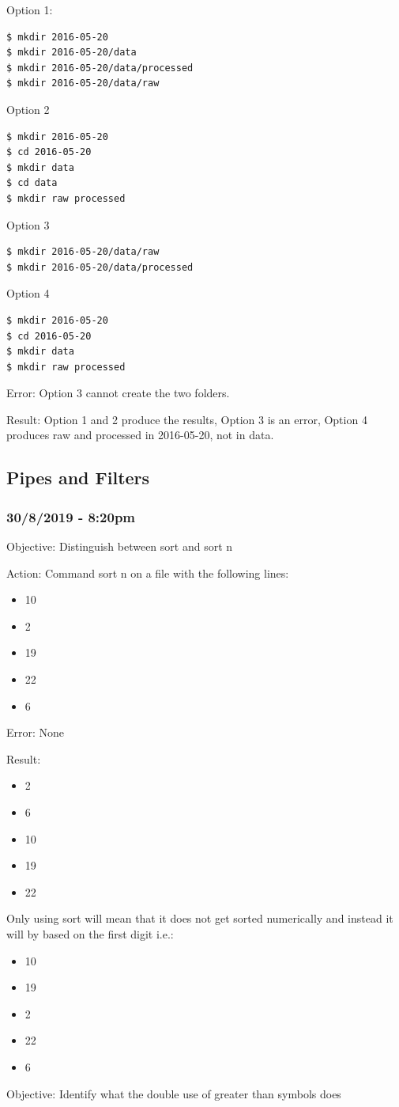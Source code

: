 \documentclass{article}
\begin{document}
Option 1:
\begin{verbatim}$ mkdir 2016-05-20
$ mkdir 2016-05-20/data
$ mkdir 2016-05-20/data/processed
$ mkdir 2016-05-20/data/raw\end{verbatim}

Option 2
\begin{verbatim}$ mkdir 2016-05-20
$ cd 2016-05-20
$ mkdir data
$ cd data
$ mkdir raw processed\end{verbatim}

Option 3
\begin{verbatim}$ mkdir 2016-05-20/data/raw
$ mkdir 2016-05-20/data/processed\end{verbatim}

Option 4
\begin{verbatim}$ mkdir 2016-05-20
$ cd 2016-05-20
$ mkdir data
$ mkdir raw processed\end{verbatim}

Error: Option 3 cannot create the two folders.\label{sec: ReproduceFolder}\par

Result: Option 1 and 2 produce the results, Option 3 is an error, Option 4 produces raw and processed in 2016-05-20, not in data.\par

\subsection{Pipes and Filters}
\subsubsection*{30/8/2019 - 8:20pm}

Objective: Distinguish between sort and sort n 

Action: Command sort n on a file with the following lines:
\begin{itemize}
\item 10 
\item 2
\item 19
\item 22
\item 6
\end{itemize}
Error: None

Result:\par
\begin{itemize}
\item 2
\item 6
\item 10
\item 19
\item 22
\end{itemize}
Only using sort will mean that it does not get sorted numerically and instead it will by based on the first digit i.e.:\par
\begin{itemize}
\item 10
\item 19
\item 2
\item 22
\item 6
\end{itemize}
Objective: Identify what the double use of greater than symbols does\par
\end{document}

